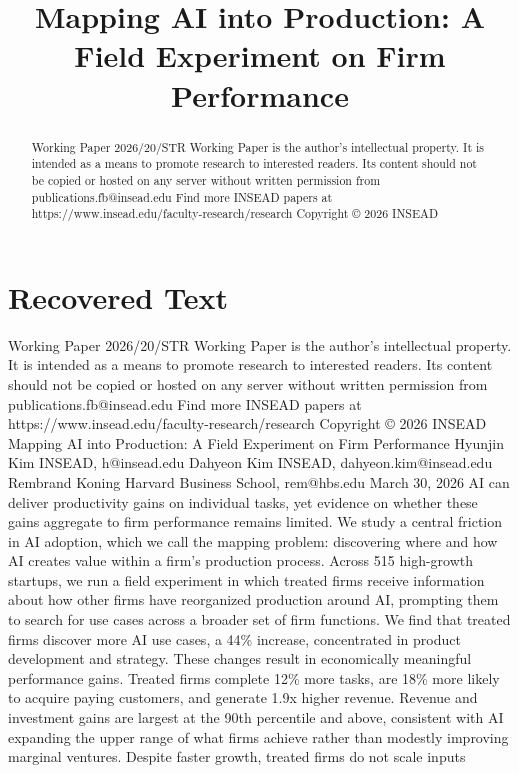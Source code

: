 \title{Mapping AI into Production: A Field Experiment on Firm Performance}

\maketitle

\begin{abstract}
Working Paper 2026/20/STR Working Paper is the author’s intellectual property. It is intended as a means to promote research to interested readers. Its content should not be copied or hosted on any server without written permission from publications.fb@insead.edu Find more INSEAD papers at https://www.insead.edu/faculty-research/research Copyright © 2026 INSEAD
\end{abstract}

\section{Recovered Text}
Working Paper
2026/20/STR
Working Paper is the author’s intellectual property. It is intended as a means to promote research to interested
readers. Its content should not be copied or hosted on any server without written permission from
publications.fb@insead.edu
Find more INSEAD papers at https://www.insead.edu/faculty-research/research
Copyright © 2026 INSEAD
Mapping AI into Production:
A Field Experiment on Firm Performance
Hyunjin Kim
INSEAD, h@insead.edu
Dahyeon Kim
INSEAD, dahyeon.kim@insead.edu
Rembrand Koning
Harvard Business School, rem@hbs.edu
March 30, 2026
AI can deliver productivity gains on individual tasks, yet evidence on whether these gains aggregate to firm
performance remains limited. We study a central friction in AI adoption, which we call the mapping problem:
discovering where and how AI creates value within a firm’s production process. Across 515 high-growth startups,
we run a field experiment in which treated firms receive information about how other firms have reorganized
production around AI, prompting them to search for use cases across a broader set of firm functions. We find that
treated firms discover more AI use cases, a 44\% increase, concentrated in product development and strategy.
These changes result in economically meaningful performance gains. Treated firms complete 12\% more tasks,
are 18\% more likely to acquire paying customers, and generate 1.9x higher revenue. Revenue and investment
gains are largest at the 90th percentile and above, consistent with AI expanding the upper range of what firms
achieve rather than modestly improving marginal ventures. Despite faster growth, treated firms do not scale inputs
